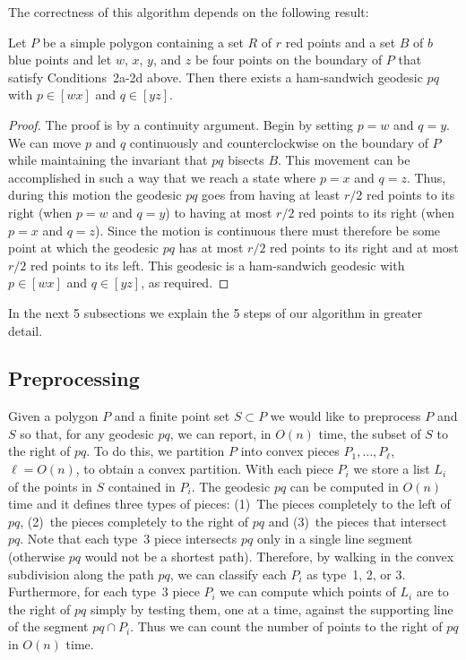 \documentclass[charterfonts,lotsofwhite]{patmorin}
\newcommand{\chain}[2]{[#1#2]}
\begin{document}
The correctness of this algorithm depends on the following result:

\begin{lem}
Let $P$ be a simple polygon containing a set $R$ of $r$ red points and
a set $B$ of $b$ blue
points and let $w$, $x$, $y$, and $z$ be four points on the boundary
of $P$ that satisfy Conditions~2a-2d above.  Then there exists a
ham-sandwich geodesic $pq$ with $p\in\chain{w}{x}$ and $q\in\chain{y}{z}$.
\end{lem}

\begin{proof}
The proof is by a continuity argument.  Begin by setting $p=w$ and
$q=y$.  We can move $p$ and $q$ continuously and counterclockwise on
the boundary of $P$ while maintaining the invariant that $pq$ bisects
$B$.  This movement can be accomplished in such a way that we
reach a state where $p=x$ and $q=z$.  Thus, during this motion the
geodesic $pq$ goes from having at least $r/2$ red points to its right
(when $p=w$ and $q=y$) to having at most $r/2$ red points to its right 
(when $p=x$ and $q=z$).  Since the motion is continuous there must
therefore be some point at which the geodesic $pq$ has at most $r/2$
red points to its right and at most $r/2$ red points to its left.
This geodesic is a ham-sandwich geodesic with $p\in\chain{w}{x}$ and
$q\in\chain{y}{z}$, as required.
\end{proof}

In the next 5 subsections we explain the 5 steps of our algorithm in
greater detail.

\subsection{Preprocessing}

Given a polygon $P$ and a finite point set $S\subset P$ we would like
to preprocess $P$ and $S$ so that, for any geodesic $pq$, we can
report, in $O(n)$ time, the subset of $S$ to the right of $pq$.  To do
this, we partition $P$ into convex pieces $P_1,\ldots,P_\ell$,
$\ell=O(n)$, to obtain a convex partition.  With each piece $P_i$ we
store a list $L_i$ of the points in $S$ contained in $P_i$.  The
geodesic $pq$ can be computed in $O(n)$ time \cite{lp84} and it defines three
types of pieces: (1)~The pieces completely to the left of $pq$,
(2)~the pieces completely to the right of $pq$ and (3)~the pieces that
intersect $pq$.  Note that each type~3 piece intersects $pq$ only in a
single line segment (otherwise $pq$ would not be a shortest path).
Therefore, by walking in the convex subdivision along the path $pq$,
we can classify each $P_i$ as type~1, 2, or 3.  Furthermore, for each
type~3 piece $P_i$ we can compute which points of $L_i$ are to the
right of $pq$ simply by testing them, one at a time, against the
supporting line of the segment $pq\cap P_i$.  Thus we can count the
number of points to the right of $pq$ in $O(n)$ time.
\end{document}
